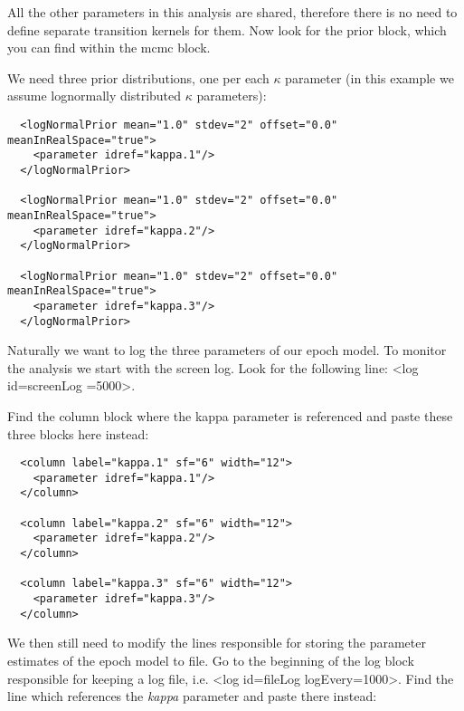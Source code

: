 All the other parameters in this analysis are shared, therefore there is no need to define separate transition kernels for them.
Now look for the {\color{darkblue}prior} block, which you can find within the {\color{darkblue}mcmc} block.

We need three prior distributions, one per each $\kappa$ parameter (in this example we assume lognormally distributed $\kappa$ parameters):

\begin{lstlisting}
  <logNormalPrior mean="1.0" stdev="2" offset="0.0" meanInRealSpace="true">
    <parameter idref="kappa.1"/>
  </logNormalPrior>
				
  <logNormalPrior mean="1.0" stdev="2" offset="0.0" meanInRealSpace="true">
    <parameter idref="kappa.2"/>
  </logNormalPrior>
				
  <logNormalPrior mean="1.0" stdev="2" offset="0.0" meanInRealSpace="true">
    <parameter idref="kappa.3"/>
  </logNormalPrior>
\end{lstlisting}

Naturally we want to log the three parameters of our epoch model. 
To monitor the analysis we start with the screen log. 
Look for the following line: <{\color{darkblue}log} {\color{darkblue}id}=\textquotedbl{}screenLog =\textquotedbl{}5000\textquotedbl{}>.

Find the {\color{darkblue}column} block where the kappa parameter is referenced and paste these three blocks here instead:

\begin{lstlisting}
  <column label="kappa.1" sf="6" width="12">
    <parameter idref="kappa.1"/>
  </column>
			
  <column label="kappa.2" sf="6" width="12">
    <parameter idref="kappa.2"/>
  </column>
			
  <column label="kappa.3" sf="6" width="12">
    <parameter idref="kappa.3"/>
  </column>
\end{lstlisting}

We then still need to modify the lines responsible for storing the parameter estimates of the epoch model to file.
Go to the beginning of the {\color{darkblue}log} block responsible for keeping a log file, i.e. <{\color{darkblue}log} {\color{darkblue}id}=\textquotedbl{}fileLog\textquotedbl{} {\color{darkblue}logEvery}=\textquotedbl{}1000\textquotedbl{}>.
Find the line which references the \textit{kappa} parameter and paste there instead:

